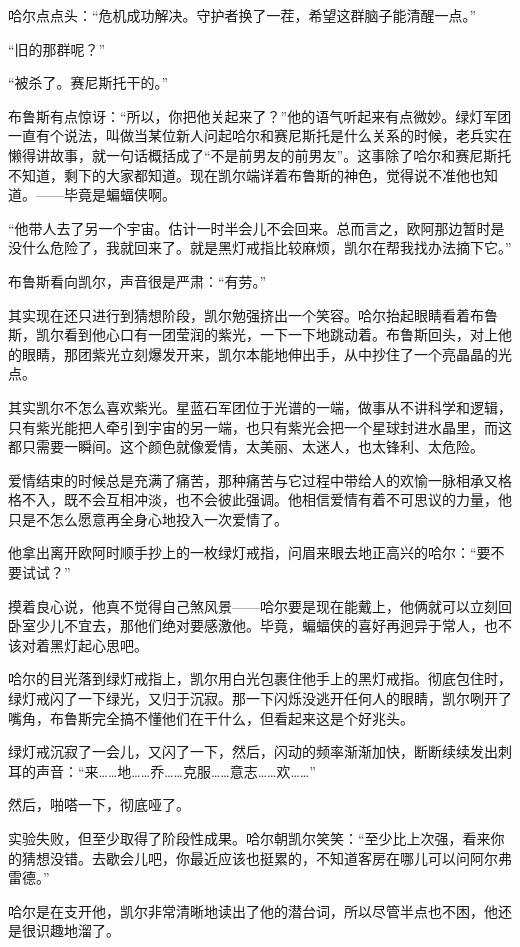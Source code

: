 \documentclass[../main]{subfiles}
\begin{document}
哈尔点点头：“危机成功解决。守护者换了一茬，希望这群脑子能清醒一点。”

“旧的那群呢？”

“被杀了。赛尼斯托干的。”

布鲁斯有点惊讶：“所以，你把他关起来了？”他的语气听起来有点微妙。绿灯军团一直有个说法，叫做当某位新人问起哈尔和赛尼斯托是什么关系的时候，老兵实在懒得讲故事，就一句话概括成了“不是前男友的前男友”。这事除了哈尔和赛尼斯托不知道，剩下的大家都知道。现在凯尔端详着布鲁斯的神色，觉得说不准他也知道。——毕竟是蝙蝠侠啊。

“他带人去了另一个宇宙。估计一时半会儿不会回来。总而言之，欧阿那边暂时是没什么危险了，我就回来了。就是黑灯戒指比较麻烦，凯尔在帮我找办法摘下它。”

布鲁斯看向凯尔，声音很是严肃：“有劳。”

其实现在还只进行到猜想阶段，凯尔勉强挤出一个笑容。哈尔抬起眼睛看着布鲁斯，凯尔看到他心口有一团莹润的紫光，一下一下地跳动着。布鲁斯回头，对上他的眼睛，那团紫光立刻爆发开来，凯尔本能地伸出手，从中抄住了一个亮晶晶的光点。

其实凯尔不怎么喜欢紫光。星蓝石军团位于光谱的一端，做事从不讲科学和逻辑，只有紫光能把人牵引到宇宙的另一端，也只有紫光会把一个星球封进水晶里，而这都只需要一瞬间。这个颜色就像爱情，太美丽、太迷人，也太锋利、太危险。

爱情结束的时候总是充满了痛苦，那种痛苦与它过程中带给人的欢愉一脉相承又格格不入，既不会互相冲淡，也不会彼此强调。他相信爱情有着不可思议的力量，他只是不怎么愿意再全身心地投入一次爱情了。

他拿出离开欧阿时顺手抄上的一枚绿灯戒指，问眉来眼去地正高兴的哈尔：“要不要试试？”

摸着良心说，他真不觉得自己煞风景——哈尔要是现在能戴上，他俩就可以立刻回卧室少儿不宜去，那他们绝对要感激他。毕竟，蝙蝠侠的喜好再迥异于常人，也不该对着黑灯起心思吧。

哈尔的目光落到绿灯戒指上，凯尔用白光包裹住他手上的黑灯戒指。彻底包住时，绿灯戒闪了一下绿光，又归于沉寂。那一下闪烁没逃开任何人的眼睛，凯尔咧开了嘴角，布鲁斯完全搞不懂他们在干什么，但看起来这是个好兆头。

绿灯戒沉寂了一会儿，又闪了一下，然后，闪动的频率渐渐加快，断断续续发出刺耳的声音：“来……地……乔……克服……意志……欢\ldots\ldots”

然后，啪嗒一下，彻底哑了。

实验失败，但至少取得了阶段性成果。哈尔朝凯尔笑笑：“至少比上次强，看来你的猜想没错。去歇会儿吧，你最近应该也挺累的，不知道客房在哪儿可以问阿尔弗雷德。”

哈尔是在支开他，凯尔非常清晰地读出了他的潜台词，所以尽管半点也不困，他还是很识趣地溜了。
\end{document}
